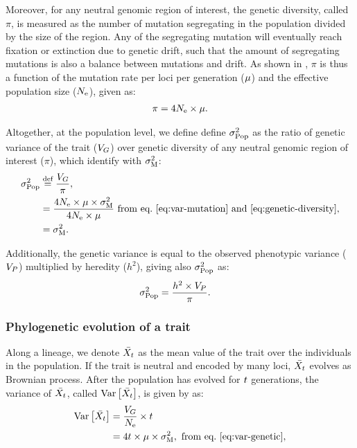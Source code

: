 \documentclass{article}
\begin{document}
Moreover, for any neutral genomic region of interest, the genetic diversity, called $\pi$, is measured as the number of mutation segregating in the population divided by the size of the region.
Any of the segregating mutation will eventually reach fixation or extinction due to genetic drift, such that the amount of segregating mutations is also a balance between mutations and drift.
As shown in \textcite{tajima_statistical_1989}, $\pi$ is thus a function of the mutation rate per loci per generation ($\mu$) and the effective population size ($N_{\text{e}}$), given as:
\begin{gather}
    \pi = 4 N_{\text{e}} \times \mu \label{eq:genetic-diversity}.
\end{gather}

Altogether, at the population level, we define define $\sigma^2_{\text{Pop}}$ as the ratio of genetic variance of the trait ($V_{G}$) over genetic diversity of any neutral genomic region of interest ($\pi$), which identify with $\sigma^2_{\text{M}}$:
\begin{align}
    \sigma^2_{\text{Pop}} & \stackrel{\text{def}}{=} \frac{V_{G} }{\pi}, \\
    & = \frac{4 N_{\text{e}} \times \mu \times \sigma^2_{\text{M}}}{4 N_{\text{e}} \times \mu} \text{ from eq.~\ref{eq:var-mutation} and~\ref{eq:genetic-diversity}}, \\
    & = \sigma^2_{\text{M}}. \label{eq:rate-pop}
\end{align}

Additionally, the genetic variance is equal to the observed phenotypic variance ($V_{P}$) multiplied by heredity ($h^2$), giving also $\sigma^2_{\text{Pop}}$ as:
\begin{align}
    \sigma^2_{\text{Pop}} & = \frac{h^2 \times V_{P} }{\pi }. \label{eq:rate-pheno-pop}
\end{align}

\subsubsection{Phylogenetic evolution of a trait}

Along a lineage, we denote $\bar{X_{t}}$ as the mean value of the trait over the individuals in the population.
If the trait is neutral and encoded by many loci, $\bar{X_{t}}$ evolves as Brownian process\cite{hansen_translating_1996}.
After the population has evolved for $t$ generations, the variance of $\bar{X_{t}}$, called $\operatorname{\text{Var}} \left[\bar{X_{t}}\right]$, is given by \textcite{hansen_translating_1996} as:
\begin{align}
    \operatorname{\text{Var}} \left[\bar{X_{t}}\right] & = \frac{V_{G}}{N_{\text{e}}} \times t \\
    & = 4 t \times \mu \times \sigma^2_{\text{M}} \label{eq:covar},\text{ from eq.~\ref{eq:var-genetic}},
\end{align}
\end{document}

